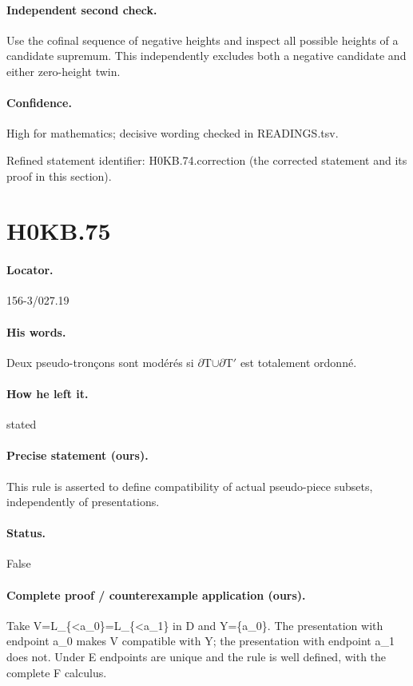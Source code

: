 \paragraph{Independent second check.} Use the cofinal sequence of negative heights and inspect all possible heights of a candidate supremum. This independently excludes both a negative candidate and either zero-height twin.

\paragraph{Confidence.} High for mathematics; decisive wording checked in READINGS.tsv.

\noindent Refined statement identifier: H0KB.74.correction (the corrected statement and its proof in this section).

\section*{H0KB.75}\label{statement:H0KB.75}
\paragraph{Locator.} 156-3/027.19

\paragraph{His words.} Deux pseudo-tronçons sont modérés si \ensuremath{\partial}T\ensuremath{\cup}\ensuremath{\partial}T\ensuremath{\prime} est totalement ordonné.

\paragraph{How he left it.} stated

\paragraph{Precise statement (ours).} This rule is asserted to define compatibility of actual pseudo-piece subsets, independently of presentations.

\paragraph{Status.} False

\paragraph{Complete proof / counterexample application (ours).} Take V=L\_\{<a\_0\}=L\_\{<a\_1\} in D and Y=\{a\_0\}. The presentation with endpoint a\_0 makes V compatible with Y; the presentation with endpoint a\_1 does not. Under E endpoints are unique and the rule is well defined, with the complete F calculus.

